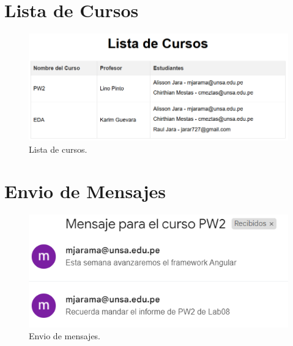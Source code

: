 \documentclass{article}
\begin{document}
\section{Lista de Cursos}
\begin{figure}[H]
	\centering
	\begin{minipage}{0.6\textwidth}
		\centering
		\includegraphics[width=\linewidth,keepaspectratio]{img/listCourses.png}
		\caption{Lista de cursos.}
	\end{minipage}
\end{figure}

\section{Envio de Mensajes}
\begin{figure}[H]
	\centering
	\begin{minipage}{0.6\textwidth}
		\centering
		\includegraphics[width=\linewidth,keepaspectratio]{img/sendMessage.png}
		\caption{Envio de mensajes.}
	\end{minipage}
\end{figure}
\end{document}
